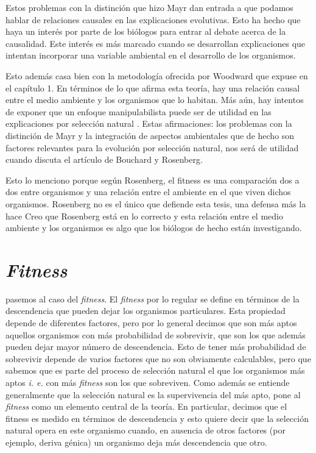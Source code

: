 Estos problemas con la distinción que hizo Mayr dan entrada a que podamos hablar de relaciones causales en las explicaciones evolutivas. Esto ha hecho que haya un interés por parte de los biólogos para entrar al debate acerca de la causalidad. Este interés es más marcado cuando se desarrollan explicaciones que intentan incorporar una variable ambiental en el desarrollo de los organismos.

Esto además casa bien con la metodología ofrecida por Woodward que expuse en el capítulo 1. En términos de lo que afirma esta teoría, hay una relación causal entre el medio ambiente y los organismos que lo habitan. Más aún, hay intentos de exponer que un enfoque manipulabilista puede ser de utilidad en las explicaciones por selección natural \cite{MacColl2011}. Estas afirmaciones: los problemas con la distinción de Mayr y la integración de aspectos ambientales que de hecho son factores relevantes para la evolución por selección natural, nos será de utilidad cuando discuta el artículo de Bouchard y Rosenberg.

Esto lo menciono porque según Rosenberg, el fitness es una comparación dos a dos entre organismos y una relación entre el ambiente en el que viven dichos organismos. Rosenberg no es el único que defiende esta tesis, una defensa más la hace \cite{Glymour2011} Creo que Rosenberg está en lo correcto y esta relación entre el medio ambiente y los organismos es algo que los biólogos de hecho están investigando.

\section{\emph{Fitness}}

\noindent pasemos al caso del \emph{fitness}. El \emph{fitness} por lo regular se define en términos de la descendencia que pueden dejar los organismos particulares. Esta propiedad depende de diferentes factores, pero por lo general decimos que son más aptos aquellos organismos con más probabilidad de sobrevivir, que son los que además pueden dejar mayor número de descendencia. Esto de tener más probabilidad de sobrevivir depende de varios factores que no son obviamente calculables, pero que sabemos que es parte del proceso de selección natural el que los organismos más aptos \emph{i. e.} con más \emph{fitness} son los que sobreviven. Como además se entiende generalmente que la selección natural es la supervivencia del más apto, pone al \emph{fitness} como un elemento central de la teoría. En particular, decimos que el fitness es medido en términos de descendencia y esto quiere decir que la selección natural opera en este organismo cuando, en ausencia de otros factores (por ejemplo, deriva génica) un organismo deja más descendencia que otro.

